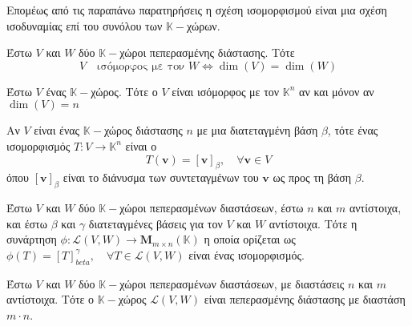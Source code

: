 Επομέως από τις παραπάνω παρατηρήσεις η σχέση ισομορφισμού είναι μια σχέση 
ισοδυναμίας επί του συνόλου των $ \mathbb{K}- $χώρων.

\begin{thm}
  Έστω $V$ και $W$ δύο $ \mathbb{K}- $χώροι πεπερασμένης διάστασης. Τότε
\[
  V \quad \text{ισόμορφος με τον $W$} \Leftrightarrow \dim(V) = \dim(W)   
 \] 
\end{thm}

\begin{cor}
  Έστω $V$ ένας $ \mathbb{K}- $χώρος. Τότε ο $V$ είναι ισόμορφος με τον 
  $ \mathbb{K}^{n} $ αν και μόνον αν $ \dim(V) = n $ 
\end{cor}

\begin{rem}
  Αν $ V $ είναι ένας $ \mathbb{K}- $χώρος διάστασης $n$ με μια διατεταγμένη βάση 
  $\beta$, τότε ένας ισομορφισμός $ T \colon V \to \mathbb{K}^{n} $ είναι ο 
  \[
    T(\mathbf{v}) = [\mathbf{v}]_{\beta}, \quad \forall \mathbf{v} \in V
   \] 
   όπου $ [\mathbf{v}]_{\beta} $ είναι το διάνυσμα των συντεταγμένων του $ \mathbf{v} $ 
   ως προς τη βάση $\beta$. 
\end{rem}

\begin{thm}
  Έστω $V$ και $W$ δύο $ \mathbb{K}- $χώροι πεπερασμένων διαστάσεων, έστω $n$ και 
  $ m $ αντίστοιχα, και έστω $\beta$ και $\gamma$ διατεταγμένες βάσεις για τον $V$ και 
  $W$ αντίστοιχα. Τότε η συνάρτηση $ \phi \colon \mathcal{L}(V,W) \to 
  \textbf{M}_{m \times n}(\mathbb{K})  $ η οποία ορίζεται ως 
  $ \phi (T) = [T]_{beta}^{\gamma}, \quad \forall 
  T \in \mathcal{L}(V,W) $ είναι ένας ισομορφισμός.
\end{thm}

\begin{cor}
  Έστω $V$ και $W$ δύο $ \mathbb{K}- $χώροι πεπερασμένων διαστάσεων, με διαστάσεις 
  $ n $ και $ m $ αντίστοιχα. Τότε ο $ \mathbb{K}- $χώρος $ \mathcal{L}(V,W) $ είναι 
  πεπερασμένης διάστασης με διαστάση $ m \cdot n $.
\end{cor}


